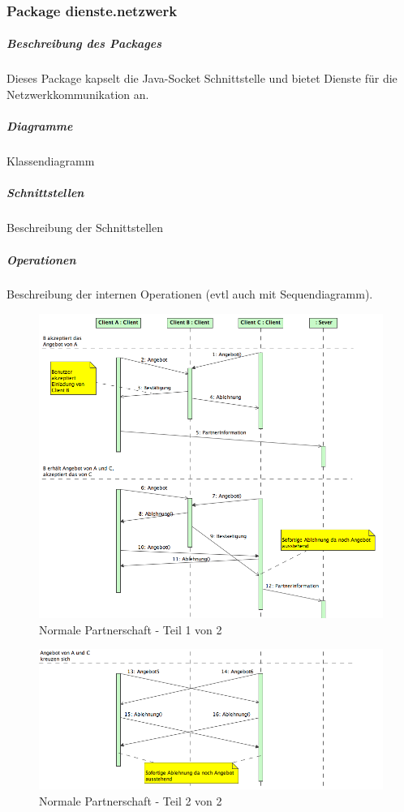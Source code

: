 \documentclass[a4paper,12pt,halfparskip,DIV14]{scrartcl}
\begin{document}
\newpage
\subsubsection{Package dienste.netzwerk} %
\label{ssub:package_dienste_netzwerk}
\subparagraph{Beschreibung des Packages} %
\label{ssub:beschreibung_des_packages}
Dieses Package kapselt die Java-Socket Schnittstelle und bietet Dienste für die Netzwerkkommunikation an.
\subparagraph{Diagramme} %
\label{ssub:diagramme}
Klassendiagramm
\subparagraph{Schnittstellen} %
\label{ssub:schnittstellen}
Beschreibung der Schnittstellen
\subparagraph{Operationen} %
\label{ssub:operationen}
Beschreibung der internen Operationen (evtl auch mit Sequendiagramm).
\begin{figure}
	[htp] \centering 
	\includegraphics[width=1\textwidth]{dienste_partnerschaft_normal_1.png} \caption{Normale Partnerschaft - Teil 1 von 2}\label{fig:dienste_partnerschaft_normal_1.png} 
\end{figure}
\begin{figure}
	[htp] \centering 
	\includegraphics[width=1\textwidth]{dienste_partnerschaft_normal_2.png} \caption{Normale Partnerschaft - Teil 2 von 2}\label{fig:dienste_partnerschaft_normal_2.png} 
\end{figure}
\end{document}
